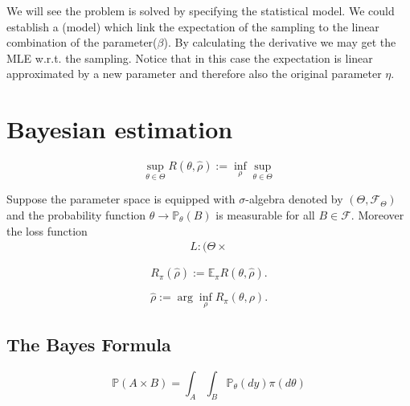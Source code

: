 We will see the problem is solved by specifying the statistical model. We could establish a (model) which link the expectation of the sampling to the linear combination of the parameter($\beta$). By calculating the derivative we may get the MLE w.r.t. the sampling. Notice that in this case the expectation is linear approximated by a new parameter and therefore also the original parameter $\eta$.



\section{Bayesian estimation}
\begin{definition}
\begin{equation}
	\sup_{\theta \in \Theta}	  R(\theta, \hat{\rho}):= \inf_{\rho} \sup_{\theta \in \Theta} 
\end{equation}
\end{definition}


\begin{definition}
	Suppose the parameter space is equipped with $\sigma$-algebra denoted by $(\Theta, \mathcal{F}_\Theta)$ and the probability function $\theta \rightarrow \mathbb{P}_\theta(B)$ is measurable for all $B \in \mathcal{F}$. Moreover the loss function
	\begin{align*}
		L: (\Theta \times 
	\end{align*}
	
	\begin{equation}
		R_\pi(\hat{\rho}):= \mathbb{E}_\pi R(\theta, \hat{\rho}). 
	\end{equation}
	
	\begin{equation}
		\hat{\rho} := \arg\inf_{\rho} R_\pi(\theta, \rho). 
	\end{equation}
\end{definition}

\subsection{The Bayes Formula}


\begin{definition}
\begin{equation*}
	\mathbb{P}(A \times B) = \int_A \int_B \mathbb{P}_\theta(dy) \pi(d\theta)
\end{equation*}
\end{definition}

